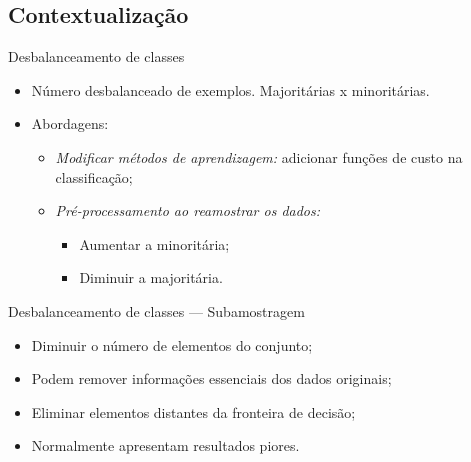 \documentclass{beamer}
\begin{document}
\subsection{Contextualização}
\begin{frame}{Desbalanceamento de classes}
  \setlength\leftmargini{1em}
  \justifying
  \begin{itemize}
    \item Número desbalanceado de exemplos. Majoritárias x minoritárias.
    \item Abordagens:
    \begin{itemize}
      \item \emph{Modificar métodos de aprendizagem:} adicionar funções de custo na classificação;
      \item \emph{Pré-processamento ao reamostrar os dados:}
      \begin{itemize}
        \item Aumentar a minoritária;
        \item Diminuir a majoritária.
      \end{itemize}
    \end{itemize}
  \end{itemize}
\end{frame}
\begin{frame}{Desbalanceamento de classes --- Subamostragem}
  \setlength\leftmargini{1em}
  \justifying
  \begin{itemize}
    \item Diminuir o número de elementos do conjunto;
    \item Podem remover informações essenciais dos dados originais;
    \item Eliminar elementos distantes da fronteira de decisão;
    \item Normalmente apresentam resultados piores.
  \end{itemize}
\end{frame}
\end{document}
